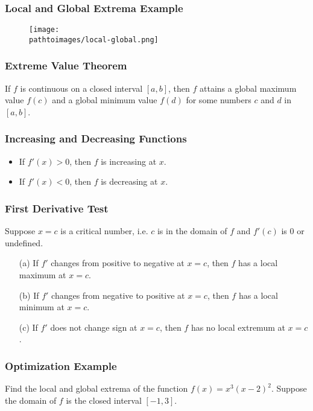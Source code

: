 \documentclass{beamer}
\newcommand{\pathtoimages}{/Users/charlesrambo/Desktop/Bootcamp24/Images}
\begin{document}
\begin{frame}
\frametitle{Local and Global Extrema Example}

\begin{figure}
\centering
\texttt{[image: \\pathtoimages/local-global.png]}
\end{figure}



\end{frame}

\begin{frame}
\frametitle{Extreme Value Theorem}

\begin{Theorem}
If $f$ is continuous on a closed interval $[a, b]$, then $f$ attains a global maximum value $f(c)$ and a global minimum value $f(d)$ for some numbers $c$ and $d$ in $[a, b]$.
\end{Theorem}

\end{frame}

\begin{frame}[t]
\frametitle{Increasing and Decreasing Functions}

\begin{itemize}
\item If $f'(x) > 0 $, then $f$ is increasing at $x$.
\item If $f' (x) < 0$, then $f$ is decreasing at $x$.
\end{itemize}

\end{frame}

\begin{frame}
\frametitle{First Derivative Test}
Suppose $x = c$ is a critical number, i.e. $c$ is in the domain of $f$ and $f'(c)$ is 0 or undefined.
\begin{itemize}
\item[(a)] If $f'$ changes from positive to negative at $x = c$, then $f$ has a local maximum at $x = c$.
\item[(b)] If $f'$ changes from negative to positive at $x = c$, then $f$ has a local minimum at $x = c$.
\item[(c)] If $f'$ does not change sign at $x = c$, then $f$ has no local extremum at $x = c$.
\end{itemize}
\end{frame}

\begin{frame}[t]
\frametitle{Optimization Example}
\small
\begin{Example}
Find the local and global extrema of the function $f(x) = x^3(x-2)^2$. Suppose the domain of $f$ is the closed interval $[-1, 3]$.
\end{Example}
\end{frame}
\end{document}
